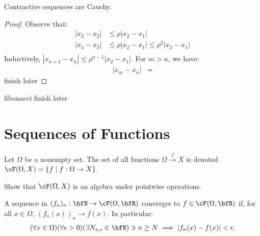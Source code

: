     \begin{proposition}
        Contractive sequences are Cauchy.
    \end{proposition}
        \begin{proof}
            Observe that:
                \begin{equation*}
                \begin{split}
                    |x_3 - x_2| &\leq \rho |x_2 - x_1| \\
                    |x_4 - x_3| &\leq \rho |x_2 - x_1|  \leq \rho^2 |x_2 - x_1|\\
                \end{split}
                \end{equation*}
            Inductively, $|x_{n+1} - x_n| \leq \rho^{n-1}|x_2 - x_1|$. For $m > n$, we have:
                \begin{equation*}
                \begin{split}
                    |x_m - x_n|
                    & = 
                \end{split}
                \end{equation*}
                {\color{red} finish later}
        \end{proof}

    \begin{example}
        {\color{red} fibonacci finish later}
    \end{example}

\section{Sequences of Functions}
    \begin{definition}
        Let $\Omega$ be a nonempty set. The set of all functions $\Omega\xrightarrow{f} X$ is denoted $\cF(\Omega,X) = \{f \mid f:\Omega \rightarrow X\}$.
    \end{definition}

    \begin{exercise}
        Show that $\cF(\Omega,X)$ is an algebra under pointwise operations.
    \end{exercise}

    \begin{definition}
        A sequence in $(f_n)_n : \bfN \rightarrow \cF(\Omega,\bfR)$ converges  to $f \in \cF(\Omega,\bfR)$ if, for all $x \in \Omega$, $(f_n(x))_n \rightarrow f(x)$. In particular:
            \begin{equation*}
            \begin{split}
                (\forall x \in \Omega)(\forall \epsilon > 0)(\exists N_{x,\epsilon} \in \bfN) \ni n \geq N \implies |f_n(x) - f(x)| < \epsilon.
            \end{split}
            \end{equation*}
    \end{definition}

